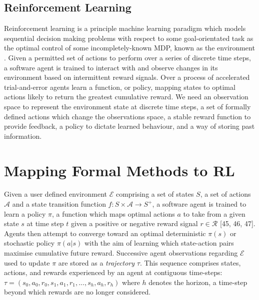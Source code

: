 \documentclass[runningheads]{llncs}
\begin{document}
\subsection{Reinforcement Learning}

Reinforcement learning is a principle machine learning paradigm which models sequential decision making problems with respect to some goal-orientated task as the optimal control of some incompletely-known MDP, known as the environment  \cite{sutton2018reinforcement}. Given a permitted set of actions to perform over a series of discrete time steps, a software agent is trained to interact with and observe changes in its environment based on intermittent reward signals. Over a process of accelerated trial-and-error agents learn a function, or policy, mapping states to optimal actions likely to return the greatest cumulative reward. We need an observation space to represent the environment state at discrete time steps, a set of formally defined actions which change the observations space, a stable reward function to provide feedback, a policy to dictate learned behaviour, and a way of storing past information. 

\section{Mapping Formal Methods to RL}
Given a user defined environment $\mathcal{E}$ comprising a set of states $S$, a set of actions $\mathcal{A}$ and a state transition function $f: S \times \mathcal{A} \to S^+$, a software agent is trained to learn a policy $\pi$, a function which maps optimal actions $a$ to take from a given state $s$ at time step $t$ given a positive or negative reward signal $r \in \mathcal{R}$ [45, 46, 47]. Agents then attempt to converge toward an optimal deterministic $\pi(s)$ or stochastic policy $\pi(a|s)$ with the aim of learning which state-action pairs maximise cumulative future reward. Successive agent observations regarding $\mathcal{E}$ used to update $\pi$ are stored as a \textit{trajectory} $\tau$. This sequence comprises states, actions, and rewards experienced by an agent at contiguous time-steps:
\begin{math}
	\tau = (s_0, a_0, r_0, s_1,a_1,r_1,...,s_h,a_h,r_h)
\end{math}
where $h$ denotes the horizon, a time-step beyond which rewards are no longer considered. \\
\end{document}
